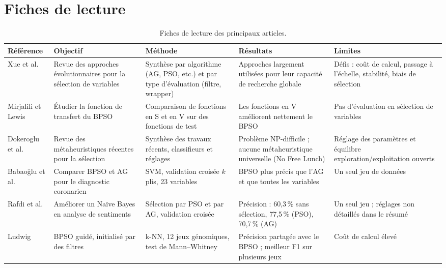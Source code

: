 \documentclass[11pt,a4paper]{report}
\begin{document}
\chapter{Fiches de lecture}
\label{ann:lecture}
\begin{table}[H]
\centering
\caption{Fiches de lecture des principaux articles.}
\label{tab:fiches}
\small
\begin{tabular}{@{}>{\raggedright}p{2.6cm}>{\raggedright}p{2.8cm}>{\raggedright}p{2.8cm}>{\raggedright}p{2.8cm}p{2.8cm}@{}}
\toprule
Référence & Objectif & Méthode & Résultats & Limites \\
\midrule
Xue et al. \cite{xue2016} & Revue des approches évolutionnaires pour la sélection de variables
  & Synthèse par algorithme (AG, PSO, etc.) et par type d'évaluation (filtre, wrapper)
  & Approches largement utilisées pour leur capacité de recherche globale
  & Défis : coût de calcul, passage à l'échelle, stabilité, biais de sélection \\
Mirjalili et Lewis \cite{mirjalili2013} & Étudier la fonction de transfert du BPSO
  & Comparaison de fonctions en S et en V sur des fonctions de test
  & Les fonctions en V améliorent nettement le BPSO
  & Pas d'évaluation en sélection de variables \\
Dokeroglu et al. \cite{dokeroglu2022} & Revue des métaheuristiques récentes pour la sélection
  & Synthèse des travaux récents, classifieurs et réglages
  & Problème NP-difficile ; aucune métaheuristique universelle (No Free Lunch)
  & Réglage des paramètres et équilibre exploration/exploitation ouverts \\
Babaoğlu et al. \cite{babaoglu2010} & Comparer BPSO et AG pour le diagnostic coronarien
  & SVM, validation croisée $k$ plis, 23 variables
  & BPSO plus précis que l'AG et que toutes les variables
  & Un seul jeu de données \\
Rafdi et al. \cite{rafdi2021} & Améliorer un Naïve Bayes en analyse de sentiments
  & Sélection par PSO et par AG, validation croisée
  & Précision : 60,3\,\% sans sélection, 77,5\,\% (PSO), 70,7\,\% (AG)
  & Un seul jeu ; réglages non détaillés dans le résumé \\
Ludwig \cite{ludwig2025} & BPSO guidé, initialisé par des filtres
  & k-NN, 12 jeux génomiques, test de Mann--Whitney
  & Précision partagée avec le BPSO ; meilleur F1 sur plusieurs jeux
  & Coût de calcul élevé \\
\bottomrule
\end{tabular}
\end{table}
\end{document}
